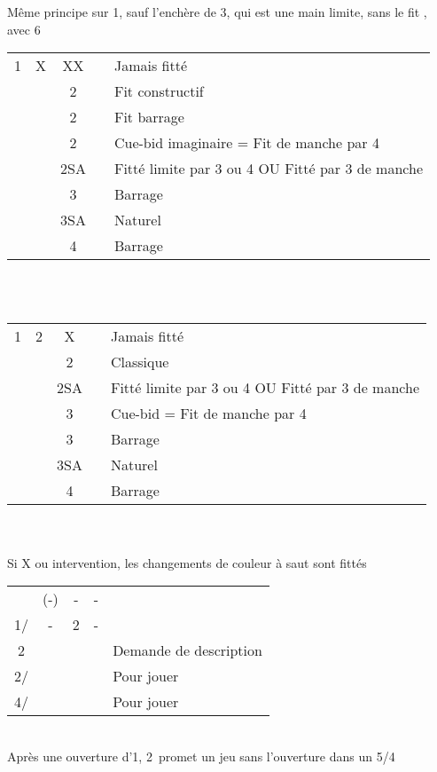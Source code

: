 \documentclass[a4paper, oneside, 11pt]{report}
\begin{document}
		Même principe sur 1\pique, sauf l'enchère de 3\coeur, qui est une main limite, sans le fit \pique,  avec 6\coeur\\

		\begin{tabular}{cccc|l}
		1\coeur & X & XX && Jamais fitté\\
		&& 2\carreau && Fit constructif\\
		&& 2\coeur && Fit barrage\\
		&& 2\pique && Cue-bid imaginaire = Fit de manche par 4\\
		&& 2SA && Fitté limite par 3 ou 4 OU Fitté par 3 de manche\\
		&& 3\coeur && Barrage\\
		&& 3SA && Naturel\\
		&& 4\coeur && Barrage\\
		\end{tabular}\\\\

		\begin{tabular}{cccc|l}
		1\coeur & 2\trefle & X && Jamais fitté\\
		&& 2\coeur && Classique\\
		&& 2SA && Fitté limite par 3 ou 4 OU Fitté par 3 de manche\\
		&& 3\trefle && Cue-bid = Fit de manche par 4\\
		&& 3\coeur && Barrage\\
		&& 3SA && Naturel\\
		&& 4\coeur && Barrage\\
		\end{tabular}\\\\

		Si X ou intervention, les changements de couleur à saut sont fittés\\

		\begin{tabular}{cccc|l}
		& (-) & - & - &\\
		1\coeur/\pique & - & 2\trefle & - &\\
		2\carreau &&&& Demande de description\\
		2\coeur/\pique &&&& Pour jouer\\
		4\coeur/\pique &&&& Pour jouer\\
		\end{tabular}\\
		Après une ouverture d'1\pique, 2\coeur\ promet un jeu sans l'ouverture dans un 5/4\\
\end{document}
